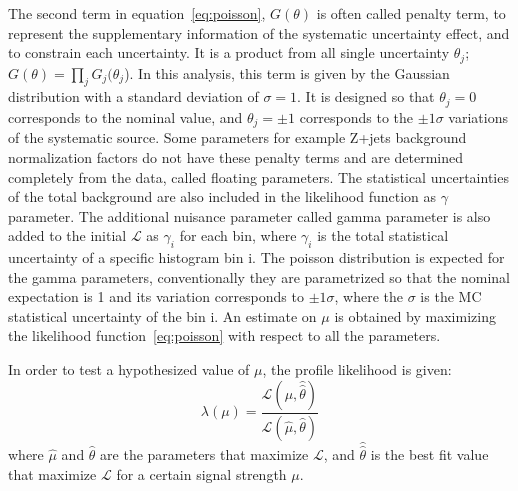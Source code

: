 The second term in equation~\ref{eq:poisson}, $G(\theta)$ is often called penalty term, to represent the supplementary information of the systematic uncertainty effect, and to constrain each uncertainty. It is a product from all single uncertainty $\theta_j$; $G(\theta) = \prod_{j}G_{j}(\theta_{j}$). 
In this analysis, this term is given by the Gaussian distribution with a standard deviation of $\sigma = 1$. It is designed so that $\theta_j = 0$ corresponds to the nominal value, and $\theta_j = \pm 1$ corresponds to the $\pm 1 \sigma$ variations of the systematic source. 
Some parameters for example Z+jets background normalization factors do not have these penalty terms and are determined completely from the data, called floating parameters.
The statistical uncertainties of the total background are also included in the likelihood function as $\gamma$ parameter. 
The additional nuisance parameter called gamma parameter is also added to the initial $\mathcal{L}$ as $\gamma_i$ for each bin, where $\gamma_i$ is the total statistical uncertainty of a specific histogram bin i. 
The poisson distribution is expected for the gamma parameters, conventionally they are parametrized so that the nominal expectation is 1 and its variation corresponds to $\pm 1 \sigma$, where the $\sigma$ is the MC statistical uncertainty of the bin i.
An estimate on $\mu$ is obtained by maximizing the likelihood function~\ref{eq:poisson} with respect to all the parameters.  

In order to test a hypothesized value of $\mu$, the profile likelihood is given:
\begin{equation}
\lambda(\mu) = \frac{\mathcal{L}\left(\mu, \hat{\hat{\theta}}\right)}{\mathcal{L}(\hat{\mu}, \hat{\theta})}
\end{equation}
where $\hat{\mu}$ and $\hat{\theta}$ are the parameters that maximize $\mathcal{L}$, and $\hat{\hat{\theta}}$ is the best fit value that maximize $\mathcal{L}$ for a certain signal strength $\mu$.

